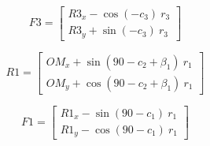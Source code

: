 \documentclass[10pt,a4paper]{article}
\begin{document}
\begin{multicols}{2}
\begin{equation}
F3 = \begin{bmatrix}
R3_x - \cos(-c_3)~r_3 \\
R3_y + \sin(-c_3)~r_3
\end{bmatrix}
\end{equation}


\begin{equation}
R1 = \begin{bmatrix}
OM_x + \sin(90-c_2+\beta_1)~r_1 \\
OM_y + \cos(90-c_2+\beta_1)~r_1
\end{bmatrix}
\end{equation}


\begin{equation}
F1 = \begin{bmatrix}
R1_x - \sin(90-c_1)~r_1 \\
R1_y - \cos(90-c_1)~r_1
\end{bmatrix}
\label{eq:F2_end}
\end{equation}

\end{multicols}
\end{document}
